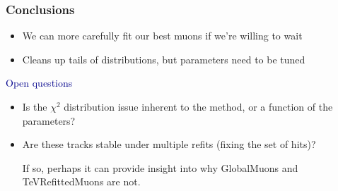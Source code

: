 \documentclass[compress]{beamer}
\begin{document}
\begin{frame}
\frametitle{Conclusions}
\begin{itemize}\setlength{\itemsep}{0.25 cm}
\item We can more carefully fit our best muons if we're willing to wait
\item Cleans up tails of distributions, but parameters need to be tuned
\end{itemize}

\vfill
\hspace{-0.83 cm} \textcolor{darkblue}{\Large Open questions}

\vspace{0.35 cm}
\begin{itemize}\setlength{\itemsep}{0.25 cm}
\item Is the $\chi^2$ distribution issue inherent to the method, or a
  function of the parameters?
\item Are these tracks stable under multiple refits (fixing the set
  of hits)?

\vspace{0.1 cm}
If so, perhaps it can provide insight into why GlobalMuons and
TeVRefittedMuons are not.
\end{itemize}
\label{numpages}
\end{frame}
\end{document}
